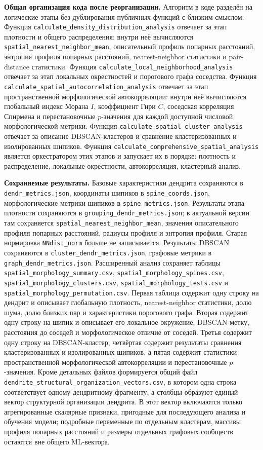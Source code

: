 \documentclass[12pt,a4paper]{article}
\begin{document}
\noindent\textbf{Общая организация кода после реорганизации.}
Алгоритм в коде разделён на логические этапы без дублирования публичных функций с близким смыслом. Функция \texttt{calculate\_density\_distribution\_analysis} отвечает за этап плотности и общего распределения: внутри неё вычисляются \texttt{spatial\_nearest\_neighbor\_mean}, описательный профиль попарных расстояний, энтропия профиля попарных расстояний, nearest-neighbor статистики и pair-distance статистики. Функция \texttt{calculate\_local\_neighborhood\_analysis} отвечает за этап локальных окрестностей и порогового графа соседства. Функция \texttt{calculate\_spatial\_autocorrelation\_analysis} отвечает за этап пространственной морфологической автокорреляции: внутри неё вычисляются глобальный индекс Морана \(I\), коэффициент Гири \(C\), соседская корреляция Спирмена и перестановочные \(p\)-значения для каждой доступной числовой морфологической метрики. Функция \texttt{calculate\_spatial\_cluster\_analysis} отвечает за описание DBSCAN-кластеров и сравнение кластеризованных и изолированных шипиков. Функция \texttt{calculate\_comprehensive\_spatial\_analysis} является оркестратором этих этапов и запускает их в порядке: плотность и распределение, локальные окрестности, автокорреляция, кластерный анализ.

\noindent\textbf{Сохраняемые результаты.}
Базовые характеристики дендрита сохраняются в \texttt{dendr\_metrics.json}, координаты шипиков в \texttt{spine\_coords.json}, морфологические метрики шипиков в \texttt{spine\_metrics.json}. Результаты этапа плотности сохраняются в \texttt{grouping\_dendr\_metrics.json}; в актуальной версии там сохраняется \texttt{spatial\_nearest\_neighbor\_mean}, значения описательного профиля попарных расстояний, радиусы профиля и энтропия профиля. Старая нормировка \texttt{NNdist\_norm} больше не записывается. Результаты DBSCAN сохраняются в \texttt{cluster\_dendr\_metrics.json}, графовые метрики в \texttt{graph\_dendr\_metrics.json}. Расширенный анализ сохраняет таблицы \texttt{spatial\_morphology\_summary.csv}, \texttt{spatial\_morphology\_spines.csv}, \texttt{spatial\_morphology\_clusters.csv}, \texttt{spatial\_morphology\_tests.csv} и \texttt{spatial\_morphology\_permutation.csv}. Первая таблица содержит одну строку на дендрит и описывает глобальную плотность, nearest-neighbor статистики, долю шума, долю близких пар и характеристики порогового графа. Вторая содержит одну строку на шипик и описывает его локальное окружение, DBSCAN-метку, расстояния до соседей и морфологическое отличие от соседей. Третья содержит одну строку на DBSCAN-кластер, четвёртая содержит результаты сравнения кластеризованных и изолированных шипиков, а пятая содержит статистики пространственной морфологической автокорреляции и перестановочные \(p\)-значения. Кроме детальных файлов формируется общий файл \texttt{dendrite\_structural\_organization\_vectors.csv}, в котором одна строка соответствует одному дендритному фрагменту, а столбцы образуют единый вектор структурной организации дендрита. В этот вектор включаются только агрегированные скалярные признаки, пригодные для последующего анализа и обучения модели; подробные переменные по отдельным кластерам, массивы профиля попарных расстояний и размеры отдельных графовых сообществ остаются вне общего ML-вектора.
\end{document}
